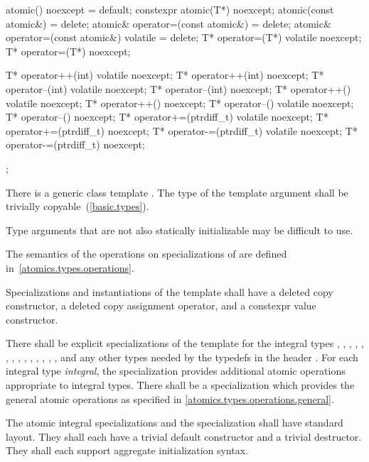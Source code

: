\begin{codeblock}
{{    atomic() noexcept = default;
    constexpr atomic(T*) noexcept;
    atomic(const atomic&) = delete;
    atomic& operator=(const atomic&) = delete;
    atomic& operator=(const atomic&) volatile = delete;
    T* operator=(T*) volatile noexcept;
    T* operator=(T*) noexcept;

    T* operator++(int) volatile noexcept;
    T* operator++(int) noexcept;
    T* operator--(int) volatile noexcept;
    T* operator--(int) noexcept;
    T* operator++() volatile noexcept;
    T* operator++() noexcept;
    T* operator--() volatile noexcept;
    T* operator--() noexcept;
    T* operator+=(ptrdiff_t) volatile noexcept;
    T* operator+=(ptrdiff_t) noexcept;
    T* operator-=(ptrdiff_t) volatile noexcept;
    T* operator-=(ptrdiff_t) noexcept;
  };
}
\end{codeblock}

\pnum
There is a generic class template . The type of the template argument
 shall be trivially copyable~(\ref{basic.types}). \begin{note} Type arguments that are
not also statically initializable may be difficult to use. \end{note}

\pnum
The semantics of the operations on specializations of  are defined
in~\ref{atomics.types.operations}.

\pnum
Specializations and instantiations of the  template shall have a deleted copy constructor, a deleted
copy assignment operator, and a constexpr value constructor.

\pnum
There shall be explicit specializations of the 
template for the integral types
,
,
,
,
,
,
,
,
,
,
,
,
,
,
and any other types needed by the typedefs in the header .
For each integral type \textit{integral}, the specialization
 provides additional atomic operations appropriate to integral types.
There shall be a specialization  which provides the general
atomic operations as specified in \ref{atomics.types.operations.general}.

\pnum
The atomic integral specializations and the specialization 
shall have standard layout. They shall each have a trivial default constructor
and a trivial destructor. They shall each support aggregate initialization
syntax.

